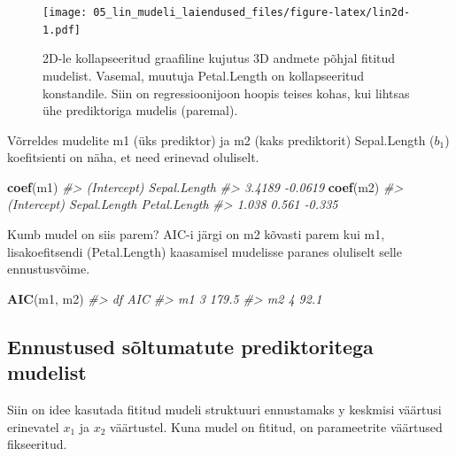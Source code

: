\documentclass[]{book}
\newenvironment{Shaded}{\begin{snugshade}}{\end{snugshade}}
\newcommand{\KeywordTok}[1]{\textcolor[rgb]{0.13,0.29,0.53}{\textbf{#1}}}
\newcommand{\CommentTok}[1]{\textcolor[rgb]{0.56,0.35,0.01}{\textit{#1}}}
\newcommand{\NormalTok}[1]{#1}
\begin{document}
\begin{figure}
\centering
\texttt{[image: 05\_lin\_mudeli\_laiendused\_files/figure-latex/lin2d-1.pdf]}
\caption{\label{fig:lin2d}2D-le kollapseeritud graafiline kujutus 3D andmete põhjal
fititud mudelist. Vasemal, muutuja Petal.Length on kollapseeritud
konstandile. Siin on regressioonijoon hoopis teises kohas, kui lihtsas
ühe prediktoriga mudelis (paremal).}
\end{figure}

Võrreldes mudelite m1 (üks prediktor) ja m2 (kaks prediktorit)
Sepal.Length (\(b_1\)) koefitsienti on näha, et need erinevad oluliselt.

\begin{Shaded}
\begin{Highlighting}[]
\KeywordTok{coef}\NormalTok{(m1)}
\CommentTok{#>  (Intercept) Sepal.Length }
\CommentTok{#>       3.4189      -0.0619}
\KeywordTok{coef}\NormalTok{(m2)}
\CommentTok{#>  (Intercept) Sepal.Length Petal.Length }
\CommentTok{#>        1.038        0.561       -0.335}
\end{Highlighting}
\end{Shaded}

Kumb mudel on siis parem? AIC-i järgi on m2 kõvasti parem kui m1,
lisakoefitsendi (Petal.Length) kaasamisel mudelisse paranes oluliselt
selle ennustusvõime.

\begin{Shaded}
\begin{Highlighting}[]
\KeywordTok{AIC}\NormalTok{(m1, m2)}
\CommentTok{#>    df   AIC}
\CommentTok{#> m1  3 179.5}
\CommentTok{#> m2  4  92.1}
\end{Highlighting}
\end{Shaded}

\subsection*{Ennustused sõltumatute prediktoritega
mudelist}\label{ennustused-soltumatute-prediktoritega-mudelist}

Siin on idee kasutada fititud mudeli struktuuri ennustamaks y keskmisi
väärtusi erinevatel \(x_1\) ja \(x_2\) väärtustel. Kuna mudel on
fititud, on parameetrite väärtused fikseeritud.
\end{document}
